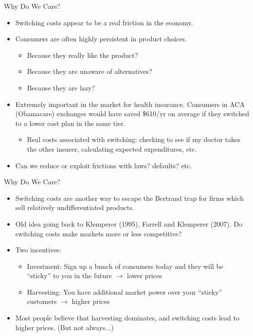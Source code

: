 \documentclass[xcolor=pdftex,dvipsnames,table,mathserif,aspectratio=169]{beamer}
\begin{document}
\begin{frame}{Why Do We Care?}
\begin{itemize}
\item Switching costs appear to be a real friction in the economy.
\item Consumers are often highly persistent in product choices.
\begin{itemize}
\item Because they really like the product?
\item Because they are unaware of alternatives?
\item Because they are lazy?
\end{itemize}
\item Extremely important in the market for \alert{health insurance}. Consumers in ACA (Obamacare) exchanges would have saved \$610/yr on average if they switched to a lower cost plan in the same tier.
\begin{itemize}
\item Real costs associated with switching: checking to see if my doctor takes the other insurer, calculating expected expenditures, etc.
\end{itemize}
\item Can we reduce or exploit frictions with laws? defaults? etc.
\end{itemize}
\end{frame} 

\begin{frame}{Why Do We Care?}
\begin{itemize}
\item Switching costs are another way to escape the Bertrand trap for firms which sell relatively undifferentiated products.
\item Old idea going back to Klemperer (1995), Farrell and Klemperer (2007). Do switching costs make markets more or less competitive?
\item Two incentives:
\begin{itemize}
\item \alert{Investment}: Sign up a bunch of consumers today and they will be ``sticky'' to you in the future $\rightarrow$ \alert{lower prices}
\item \alert{Harvesting}: You have additional market power over your ``sticky'' customers $\rightarrow$ \alert{higher prices}
\end{itemize}
\item Most people believe that \alert{harvesting} dominates, and switching costs lead to \alert{higher} prices. (But not always...)
\end{itemize}
\end{frame} 
\end{document}
